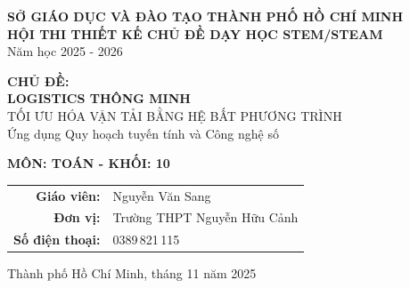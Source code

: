 \documentclass[12pt,a4paper]{article}
\begin{document}
\begin{titlepage}

\vspace{2cm}
\begin{center}
{\LARGE\bfseries\color{primary}\sffamily SỞ GIÁO DỤC VÀ ĐÀO TẠO THÀNH PHỐ HỒ CHÍ MINH}\\
\vspace{0.5cm}
{\Large\bfseries\sffamily HỘI THI THIẾT KẾ CHỦ ĐỀ DẠY HỌC STEM/STEAM}\\
\vspace{0.3cm}
{\large\sffamily Năm học 2025 - 2026}

\vspace{2cm}

\begin{tcolorbox}[width=0.9\textwidth, colback=gray!5, colframe=primary, arc=2mm, boxrule=1pt]
    \centering
    {\LARGE\bfseries\sffamily CHỦ ĐỀ:} \\
    {\Huge\bfseries\color{accent}\sffamily LOGISTICS THÔNG MINH}\\
    \vspace{0.25cm}
    {\Large\sffamily TỐI ƯU HÓA VẬN TẢI BẰNG HỆ BẤT PHƯƠNG TRÌNH}\\
    \vspace{0.25cm}
    {\large\sffamily Ứng dụng Quy hoạch tuyến tính và Công nghệ số}
\end{tcolorbox}

\vspace{1.5cm}
{\Large\bfseries\sffamily MÔN: TOÁN - KHỐI: 10}

\vfill
\large
\begin{tabular}{rl}
\sffamily\bfseries Giáo viên: & Nguyễn Văn Sang\\
\sffamily\bfseries Đơn vị: & Trường THPT Nguyễn Hữu Cảnh\\
\sffamily\bfseries Số điện thoại: & 0389\,821\,115\\
\end{tabular}

\vspace{1cm}
{\large\sffamily Thành phố Hồ Chí Minh, tháng 11 năm 2025}
\end{center}
\end{titlepage}
\end{document}

